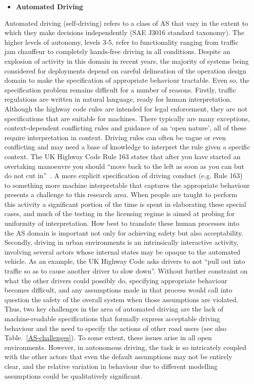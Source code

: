 \documentclass[sigconf,nonacm]{acmart}%
\begin{document}
	\begin{itemize}[leftmargin=0.5cm]
		\item \textbf{Automated Driving} 
	\end{itemize}
	Automated driving (self-driving) refers to a class of AS that vary in the extent to which they make decisions independently (SAE J3016 standard taxonomy). The higher levels of autonomy, levels 3-5, refer to functionality ranging from traffic jam chauffeur to completely hands-free driving in all conditions. Despite an explosion of activity in this domain in recent years, the majority of systems being considered for deployments depend on careful delineation of the operation design domain to make the specification of appropriate behaviour tractable. Even so, the specification problem remains difficult for a number of reasons. 
	Firstly, traffic regulations are written in natural language, ready for human interpretation. Although the highway code rules are intended for legal enforcement, they are not specifications that are suitable for machines. 
	There typically are many exceptions, context-dependent conflicting rules and guidance of an `open nature', all of these require interpretation in context. 
	Driving rules can often be vague or even conflicting and may need a base of knowledge to interpret the rule given a specific context. The UK Highway Code Rule 163 states that after you have started an overtaking manoeuvre you should ``move back to the left as soon as you can but do not cut in''~\cite{UKHighwayCode22}. A more explicit specification of driving conduct (e.g. Rule 163) to something more machine interpretable that captures the appropriate behaviour presents a challenge to this research area. When people are taught to perform this activity a significant portion of the time is spent in elaborating these special cases, and much of the testing in the licensing regime is aimed at probing for uniformity of interpretation. How best to translate these human processes into the AS domain is important not only for achieving safety but also acceptability.
	Secondly, driving in urban environments is an intrinsically interactive activity, involving several actors whose internal states may be opaque to the automated vehicle. As an example, the UK Highway Code asks drivers to not ``pull out into traffic so as to cause another driver to slow down''. 
	Without further constraint on what the other drivers could possibly do, specifying appropriate behaviour becomes difficult, and any assumptions made in that process would call into question the safety of the overall system when those assumptions are violated. 
	Thus, two key challenges in the area of automated driving are the lack of machine-readable specifications that formally express acceptable driving behaviour and the need to specify the actions of other road users (see also Table.~\ref{AS-challenges}). To some extent, these issues arise in all open environments. However, in autonomous driving, the task is so intricately coupled with the other actors that even the default assumptions may not be entirely clear, and the relative variation in behaviour due to different modelling assumptions could be qualitatively significant.
	
\end{document}

